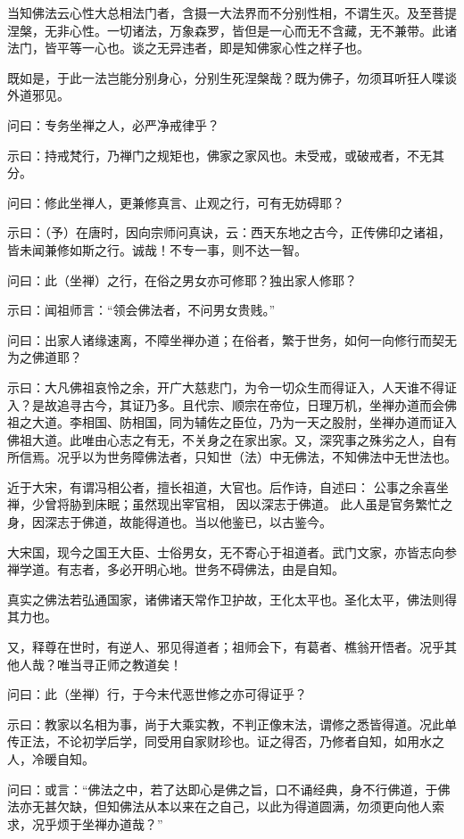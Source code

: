 当知佛法云心性大总相法门者，含摄一大法界而不分别性相，不谓生灭。及至菩提涅槃，无非心性。一切诸法，万象森罗，皆但是一心而无不含藏，无不兼带。此诸法门，皆平等一心也。谈之无异违者，即是知佛家心性之样子也。

既如是，于此一法岂能分别身心，分别生死涅槃哉？既为佛子，勿须耳听狂人喋谈外道邪见。

问曰：专务坐禅之人，必严净戒律乎？

示曰：持戒梵行，乃禅门之规矩也，佛家之家风也。未受戒，或破戒者，不无其分。

问曰：修此坐禅人，更兼修真言、止观之行，可有无妨碍耶？

示曰：（予）在唐时，因向宗师问真诀，云：西天东地之古今，正传佛印之诸祖，皆未闻兼修如斯之行。诚哉！不专一事，则不达一智。

问曰：此（坐禅）之行，在俗之男女亦可修耶？独出家人修耶？

示曰：闻祖师言：“领会佛法者，不问男女贵贱。”

问曰：出家人诸缘速离，不障坐禅办道；在俗者，繁于世务，如何一向修行而契无为之佛道耶？

示曰：大凡佛祖哀怜之余，开广大慈悲门，为令一切众生而得证入，人天谁不得证入？是故追寻古今，其证乃多。且代宗、顺宗在帝位，日理万机，坐禅办道而会佛祖之大道。李相国、防相国，同为辅佐之臣位，乃为一天之股肘，坐禅办道而证入佛祖大道。此唯由心志之有无，不关身之在家出家。又，深究事之殊劣之人，自有所信焉。况乎以为世务障佛法者，只知世（法）中无佛法，不知佛法中无世法也。

近于大宋，有谓冯相公者，擅长祖道，大官也。后作诗，自述曰：
\begintt
  公事之余喜坐禅，少曾将胁到床眠；虽然现出宰官相，
因以深志于佛道。
\endtt
\noindent 此人虽是官务繁忙之身，因深志于佛道，故能得道也。当以他鉴已，以古鉴今。

大宋国，现今之国王大臣、士俗男女，无不寄心于祖道者。武门文家，亦皆志向参禅学道。有志者，多必开明心地。世务不碍佛法，由是自知。

真实之佛法若弘通国家，诸佛诸天常作卫护故，王化太平也。圣化太平，佛法则得其力也。

又，释尊在世时，有逆人、邪见得道者；祖师会下，有葛者、樵翁开悟者。况乎其他人哉？唯当寻正师之教道矣！

问曰：此（坐禅）行，于今末代恶世修之亦可得证乎？

示曰：教家以名相为事，尚于大乘实教，不判正像末法，谓修之悉皆得道。况此单传正法，不论初学后学，同受用自家财珍也。证之得否，乃修者自知，如用水之人，冷暖自知。

问曰：或言：“佛法之中，若了达即心是佛之旨，口不诵经典，身不行佛道，于佛法亦无甚欠缺，但知佛法从本以来在之自己，以此为得道圆满，勿须更向他人索求，况乎烦于坐禅办道哉？”

